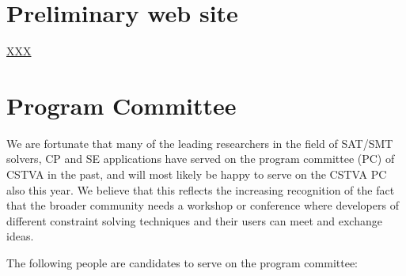 \documentclass{sig-alternate}
\begin{document}

\section{Preliminary web site}
\vspace{0.2cm} \url{XXX}

\section{Program Committee}
\vspace{0.2cm} We are fortunate that many of the leading researchers
in the field of SAT/SMT solvers, CP and SE applications have served on the program committee (PC) of CSTVA in the past, and will most likely be happy to serve on the CSTVA PC also this year. We believe
that this reflects the increasing recognition of the fact that the
broader community needs a workshop or conference where developers of
different constraint solving techniques and their users can meet and
exchange ideas.

\vspace{0.2cm}
The following people are candidates to serve on the program
committee:
\end{document}
